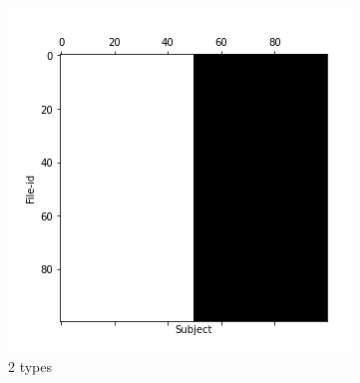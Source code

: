\documentclass[10pt, conference, compsocconf]{IEEEtran}
\begin{document}
\begin{figure}
\centering
        \begin{subfigure}[b]{0.3\columnwidth}
                  \includegraphics[width=\columnwidth]{data/Utility_Matrix/Synthetic/synthetic_subject_types/2_SubjectType_utility_matrix.png}
                  \caption{2 types}
        \end{subfigure}
                \begin{subfigure}[b]{0.3\columnwidth}

\end{subfigure}
\end{figure}
\end{document}

